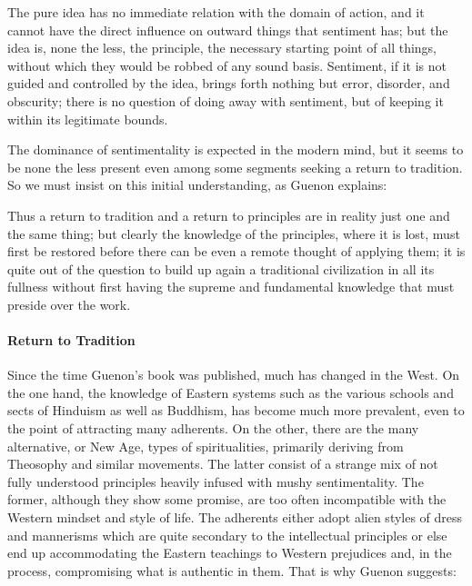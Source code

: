 \begin{quotex}
The pure idea has no immediate relation with the domain of action, and it cannot have the direct influence on outward things that sentiment has; but the idea is, none the less, the principle, the necessary starting point of all things, without which they would be robbed of any sound basis. Sentiment, if it is not guided and controlled by the idea, brings forth nothing but error, disorder, and obscurity; there is no question of doing away with sentiment, but of keeping it within its legitimate bounds.

\end{quotex}
The dominance of sentimentality is expected in the modern mind, but it seems to be none the less present even among some segments seeking a return to tradition. So we must insist on this initial understanding, as Guenon explains:

\begin{quotex}
Thus a return to tradition and a return to principles are in reality just one and the same thing; but clearly the knowledge of the principles, where it is lost, must first be restored before there can be even a remote thought of applying them; it is quite out of the question to build up again a traditional civilization in all its fullness without first having the supreme and fundamental knowledge that must preside over the work.

\end{quotex}
\paragraph{Return to Tradition}
Since the time Guenon's book was published, much has changed in the West. On the one hand, the knowledge of Eastern systems such as the various schools and sects of Hinduism as well as Buddhism, has become much more prevalent, even to the point of attracting many adherents. On the other, there are the many alternative, or New Age, types of spiritualities, primarily deriving from Theosophy and similar movements. The latter consist of a strange mix of not fully understood principles heavily infused with mushy sentimentality. The former, although they show some promise, are too often incompatible with the Western mindset and style of life. The adherents either adopt alien styles of dress and mannerisms which are quite secondary to the intellectual principles or else end up accommodating the Eastern teachings to Western prejudices and, in the process, compromising what is authentic in them. That is why Guenon suggests:

